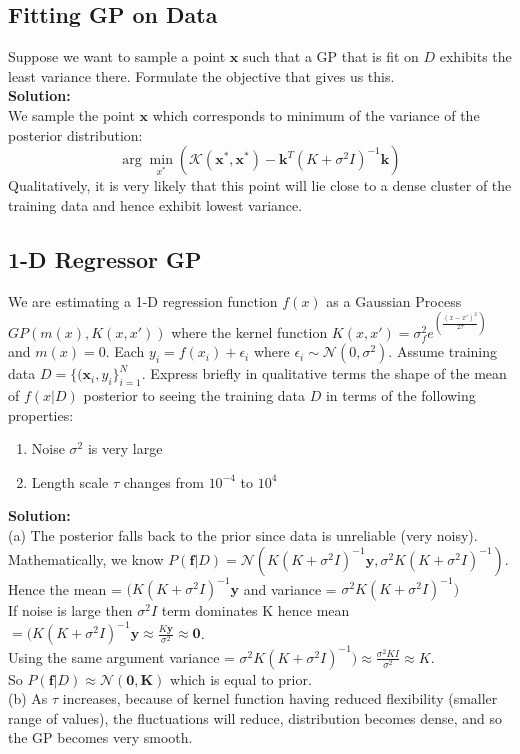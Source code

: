 \documentclass[12pt]{article}
\begin{document}
\subsection{Fitting GP on Data}
Suppose we want to sample a point $\mathbf{x}$ such that a GP that is fit on $D$ exhibits the least variance there. Formulate the objective that gives us this. \\

\noindent \textbf{Solution:} \\

\noindent We sample the point $\mathbf{x}$ which corresponds to minimum of the variance of the posterior distribution: \[ \arg \min_{x^*}  \left( \mathcal{K}(\mathbf{x}^*, \mathbf{x}^*) - \mathbf{k}^T (K + \sigma^2 I)^{-1} \mathbf{k} \right) \]
Qualitatively, it is very likely that this point will lie close to a dense cluster of the training data and hence exhibit lowest variance.

\subsection{1-D Regressor GP}
We are estimating a 1-D regression function $f(x)$ as a Gaussian Process $GP(m(x),K(x,x'))$ where the kernel function $K(x,x') = \sigma_f^2 e^{\left( \frac{(x - x')^2}{2 \tau} \right)}$ and $m(x) = 0$. Each $y_i = f(x_i) + \epsilon_i$ where $\epsilon_i \sim \mathcal{N}(0,\sigma^2)$. Assume training data $D = \{ (\mathbf{x}_i,y_i \}_{i = 1}^N$. Express briefly in qualitative terms the shape of the mean of $f(x|D)$ posterior to seeing the training data $D$ in terms of the following properties:

\begin{enumerate}[label = (\alph*)]
    \item Noise $\sigma^2$ is very large
    \item Length scale $\tau$ changes from $10^{-4}$ to $10^4$
\end{enumerate}

\noindent \textbf{Solution:} \\

\noindent (a) The posterior falls back to the prior since data is unreliable (very noisy). \\
\noindent Mathematically, we know \(P(\mathbf{f}|D) = \mathcal{N}(K(K + \sigma^2 I)^{-1} \mathbf{y}, \sigma^2 K(K + \sigma^2 I)^{-1})\). \\
Hence the mean = \((K(K + \sigma^2 I)^{-1} \mathbf{y}\) and variance = \(\sigma^2 K(K + \sigma^2 I)^{-1})\) \\
If noise is large then \(\sigma^2 I\) term dominates K hence mean \(=(K(K + \sigma^2 I)^{-1} \mathbf{y} \approx \frac{K\mathbf{y}}{\sigma^2} \approx \mathbf{0}\). \\
Using the same argument variance = \(\sigma^2 K(K + \sigma^2 I)^{-1}) \approx \frac{\sigma^2 K I}{\sigma^2} \approx K \). \\
So \(P(\mathbf{f}|D) \approx \mathcal{N}(\mathbf{0,K})\) which is equal to prior. \\

\noindent (b) As $\tau$ increases, because of kernel function having reduced flexibility (smaller range of values), the fluctuations will reduce, distribution becomes dense, and so the GP becomes very smooth.

\end{document}
